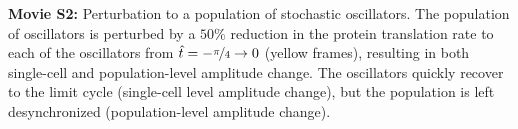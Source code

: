 \documentclass[11pt, letterpaper]{article}
\begin{document}
{\bfseries Movie S2:} Perturbation to a population of stochastic
oscillators. The population of oscillators is perturbed by a $50\%$ reduction
in the protein translation rate to each of the oscillators from $\hat{t} =
-\nicefrac{\pi}{4} \to 0$ (yellow frames), resulting in both single-cell and
population-level amplitude change. The oscillators quickly recover to the limit
cycle (single-cell level amplitude change), but the population is left
desynchronized (population-level amplitude change).

\renewcommand{\refname}{Supporting References}


\end{document}
